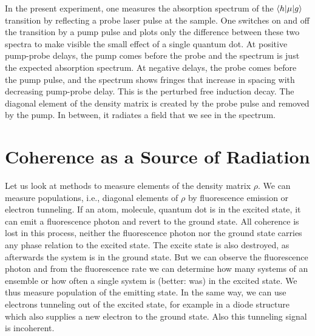  
In the present experiment, one measures the absorption spectrum of the  $\braket{h | \mu | g}$ transition by reflecting a probe laser pulse at the sample. One switches on and off the transition by a pump pulse and plots only the difference between these two spectra to make visible the small effect of a single quantum dot. At positive pump-probe delays, the pump comes before the probe and the spectrum is just the expected absorption spectrum. At negative delays, the probe comes before the pump pulse, and the spectrum shows fringes that increase in spacing with decreasing pump-probe delay. This is the perturbed free induction decay. The diagonal element of the density matrix is created by the probe pulse and removed by the pump. In between, it radiates a field that we see in the spectrum.

\section{Coherence as a Source of Radiation}


Let us look at methods to measure elements of the density matrix $\rho$. We can measure populations, i.e., diagonal elements of $\rho$ by fluorescence emission or electron tunneling. If an atom, molecule, quantum dot is in the excited state, it can emit a fluorescence photon and revert to the ground state. All coherence is lost in this process, neither the fluorescence photon nor the ground state carries any phase relation to the excited state. The excite state is also destroyed, as afterwards the system is in the ground state. But we can observe the fluorescence photon and from the fluorescence rate we can determine how many systems of an ensemble or how often a single system is (better: was) in the excited state. We thus measure population of the emitting state. In the same way, we can use electrons tunneling out of the excited state, for example in a diode structure which also supplies  a new electron to the ground state. Also this tunneling signal is incoherent.

